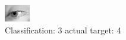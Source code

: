 \begin{figure}[h!]
\begin{center}
\includegraphics[width=0.60\columnwidth]{figures/ID2905_class_3_target_4.png}
\end{center}
\caption{ Classification: 3 actual target: 4}
\label{fig:ID2905_class_3_target_4}
\end{figure}
